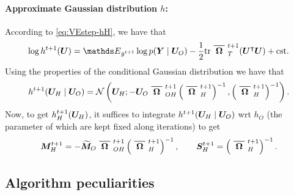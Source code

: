 \paragraph{Approximate Gaussian distribution $h$:} 
According to \eqref{eq:VEstep-hH}, we have that
$$
\log h^{t+1}(\Ubf) 
= \Esp_{g^{t+1}} \log p(\Ybf \mid \Ubf_O) - \frac{1}{2} \tr{ \xbar{\Omegabf}^{t+1}_T ( \Ubf^\intercal \Ubf)} + \text{cst}.
$$
Using the properties of the conditional Gaussian distribution we have that
$$
h^{t+1}(\Ubf_H \mid \Ubf_O) = \Ncal\left(\Ubf_H; 
-\Ubf_O \xbar{\Omegabf}^{t+1}_{OH} \left(\xbar{\Omegabf}^{t+1}_{H}\right)^{-1}, \left(\xbar{\Omegabf}^{t+1}_{H}\right)^{-1}\right).
$$
Now, to get $h_H^{t+1}({\boldsymbol{U}}_H)$, it suffices to integrate $h^{t+1}({\boldsymbol{U}}_H \mid {\boldsymbol{U}}_O)$ wrt $h_O$ (the parameter of which are kept fixed along iterations) to get
$$
\Mbf^{t+1}_H = -\widetilde{\Mbf}_O \xbar{\Omegabf}^{t+1}_{OH} \left(\xbar{\Omegabf}^{t+1}_{H}\right)^{-1}, 
\qquad
\Sbf^{t+1}_H = \left(\xbar{\Omegabf}^{t+1}_{H}\right)^{-1}.
$$


\subsection{Algorithm peculiarities} \label{sec:algoSpec}

